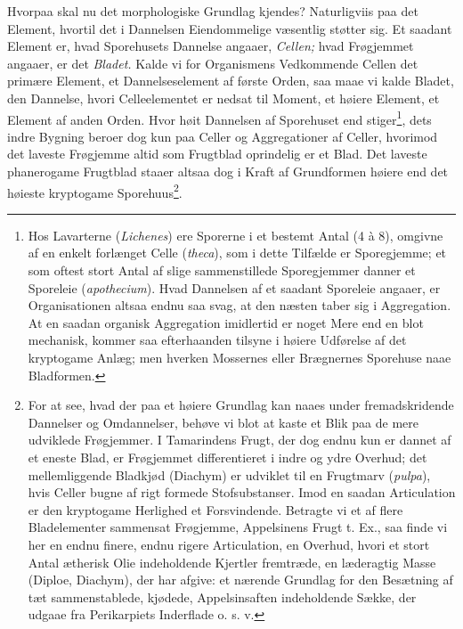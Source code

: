 \documentclass[12pt,a4paper]{book}
\begin{document}
Hvorpaa skal nu det morphologiske Grundlag kjendes? Naturligviis paa det
Element, hvortil det i Dannelsen Eiendommelige væsentlig støtter sig. Et
saadant Element er, hvad Sporehusets Dannelse angaaer,
\emph{Cellen;} hvad Frøgjemmet angaaer, er det \emph{Bladet.} Kalde vi
for Organismens Vedkommende Cellen det primære Element, et
Dannelseselement af første Orden, saa maae vi kalde Bladet, den
Dannelse, hvori Celleelementet er nedsat til Moment, et høiere Element,
et Element af anden Orden. Hvor høit Dannelsen af Sporehuset end
stiger\footnote{Hos Lavarterne (\textit{Lichenes}) ere Sporerne i et
bestemt Antal (4 à 8), omgivne af en enkelt forlænget Celle
(\textit{theca}), som i dette Tilfælde er Sporegjemme; et som oftest
stort Antal af slige sammenstillede Sporegjemmer danner et Sporeleie
(\textit{apothecium}). Hvad Dannelsen af et saadant Sporeleie angaaer,
er Organisationen altsaa endnu saa svag, at den næsten taber sig i
Aggregation. At en saadan organisk Aggregation imidlertid er noget Mere
end en blot mechanisk, kommer saa efterhaanden tilsyne i høiere
Udførelse af det kryptogame Anlæg; men hverken Mossernes eller
Brægnernes Sporehuse naae Bladformen.}, dets indre Bygning beroer dog
kun paa
\setcounter{footnote}{0}
Celler og Aggregationer af Celler, hvorimod det laveste Frøgjemme altid
som Frugtblad oprindelig er et Blad. Det laveste phanerogame Frugtblad
staaer altsaa dog i Kraft af Grundformen høiere end det høieste
kryptogame Sporehuus\footnote{For at see, hvad der paa et høiere
Grundlag kan naaes under fremadskridende Dannelser og Omdannelser,
behøve vi blot at kaste et Blik paa de mere udviklede Frøgjemmer. I
Tamarindens Frugt, der dog endnu kun er dannet af et eneste Blad, er
Frøgjemmet differentieret i indre og ydre Overhud; det mellemliggende
Bladkjød (Diachym) er udviklet til en Frugtmarv (\textit{pulpa}), hvis
Celler bugne af rigt formede Stofsubstanser. Imod en saadan Articulation
er den kryptogame Herlighed et Forsvindende.
Betragte vi et af flere Bladelementer sammensat Frøgjemme, Appelsinens
Frugt t. Ex., saa finde vi her en endnu finere, endnu rigere
Articulation, en Overhud, hvori et stort Antal ætherisk Olie
indeholdende Kjertler fremtræde, en læderagtig Masse (Diploe, Diachym),
der har afgive: et nærende Grundlag for den Besætning af tæt
sammenstablede, kjødede, Appelsinsaften indeholdende Sække, der udgaae
fra Perikarpiets Inderflade o. s. v.
}.
\end{document}
